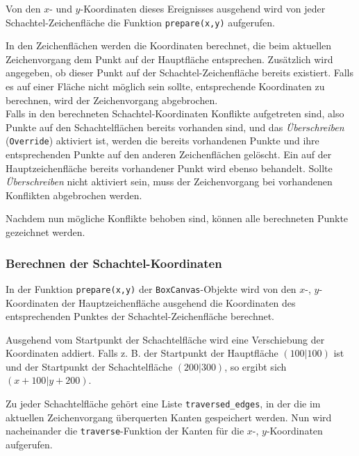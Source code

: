 Von den $x$- und $y$-Koordinaten dieses Ereignisses ausgehend wird von jeder Schachtel-Zeichenfläche die Funktion \texttt{prepare(x,y)} aufgerufen.

In den Zeichenflächen werden die Koordinaten berechnet, die beim aktuellen Zeichenvorgang dem Punkt auf der Hauptfläche entsprechen. Zusätzlich wird angegeben, ob dieser Punkt auf der Schachtel-Zeichenfläche bereits existiert. Falls es auf einer Fläche nicht möglich sein sollte, entsprechende Koordinaten zu berechnen, wird der Zeichenvorgang abgebrochen.\\

Falls in den berechneten Schachtel-Koordinaten Konflikte aufgetreten sind, also Punkte auf den Schachtelflächen bereits vorhanden sind, und das \emph{Überschreiben} (\texttt{Override}) aktiviert ist, werden die bereits vorhandenen Punkte und ihre entsprechenden Punkte auf den anderen Zeichenflächen gelöscht. Ein auf der Hauptzeichenfläche bereits vorhandener Punkt wird ebenso behandelt. Sollte \emph{Überschreiben} nicht aktiviert sein, muss der Zeichenvorgang bei vorhandenen Konflikten abgebrochen werden.

Nachdem nun mögliche Konflikte behoben sind, können alle berechneten Punkte gezeichnet werden.


\subsubsection{Berechnen der Schachtel-Koordinaten}
\label{subsubsec:schachtelkoordinaten}

In der Funktion \texttt{prepare(x,y)} der \texttt{BoxCanvas}-Objekte wird von den $x$-, $y$-Koordinaten der Hauptzeichenfläche ausgehend die Koordinaten des entsprechenden Punktes der Schachtel-Zeichenfläche berechnet.

Ausgehend vom Startpunkt der Schachtelfläche wird eine Verschiebung der Koordinaten addiert. Falls z. B. der Startpunkt der Hauptfläche $(100|100)$ ist und der Startpunkt der Schachtelfläche $(200|300)$, so ergibt sich $(x+100|y+200)$.

Zu jeder Schachtelfläche gehört eine Liste \texttt{traversed\_edges}, in der die im aktuellen Zeichenvorgang überquerten Kanten gespeichert werden. Nun wird nacheinander die \texttt{traverse}-Funktion der Kanten für die $x$-, $y$-Koordinaten aufgerufen.

